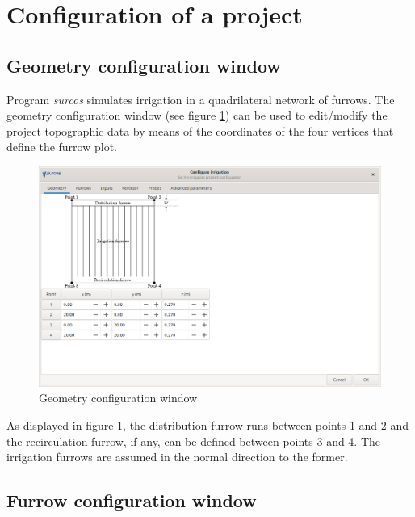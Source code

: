\section{Configuration of a project}

\subsection{Geometry configuration window}

Program \emph{surcos} simulates irrigation in a quadrilateral network of
furrows. The geometry configuration window (see figure \ref{geomWindow}) can be
used to edit/modify the project topographic data by means of the coordinates of
the four vertices that define the furrow plot.

\begin{figure}[!h]
\begin{center}
\includegraphics*[width=\textwidth]{images/confGeomEN.png}
\qquad
\caption{Geometry configuration window}\label{geomWindow}
\end{center}
\end{figure}

As displayed in figure \ref{geomWindow}, the distribution furrow runs between points 1 and 2 and the recirculation furrow, if any, can be defined between points 3 and 4. The irrigation furrows are assumed in the normal direction to the former.

\subsection{Furrow configuration window}

